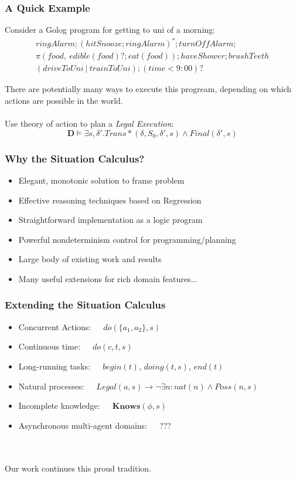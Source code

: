 \documentclass{beamer}
\newcommand{\Knows}{\mathbf{Knows}}
\begin{document}
\begin{frame}
\frametitle{A Quick Example}
Consider a Golog program for getting to uni of a morning:\[
\begin{array}{c}
ringAlarm;(hitSnooze; ringAlarm)^*;turnOffAlarm;\\
\pi(food,\ edible(food)?;eat(food)); haveShower; brushTeeth\\
(driveToUni\ |\ trainToUni); (time<9:00)?
\end{array}\]

There are potentially many ways to execute this progream, depending on which 
actions are possible in the world.
\pause
\ \\
\ \\
Use theory of action to plan a \emph{Legal Execution}:\[
\mathbf{D} \models \exists s,\delta' . Trans*(\delta,S_0,\delta',s) \wedge Final(\delta',s)\]

\end{frame}

\begin{frame}
\frametitle{Why the Situation Calculus?}
\begin{itemize}
\item Elegant, monotonic solution to frame problem
\item Effective reasoning techniques based on Regression
\item Straightforward implementation as a logic program
\item Powerful nondeterminism control for programming/planning
\item Large body of existing work and results
\item Many useful extensions for rich domain features...
\end{itemize}
\end{frame}

\begin{frame}
\frametitle{Extending the Situation Calculus}
\begin{itemize}
\pause
\item Concurrent Actions:\ \ \ $do(\{a_1,a_2\},s)$
\pause
\item Continuous time:\ \ \ $do(c,t,s)$
\pause
\item Long-running tasks:\ \ \ $begin(t)$, $doing(t,s)$, $end(t)$
\pause
\item Natural processes:\ \ \ $Legal(a,s)\rightarrow\neg\exists n: nat(n) \wedge Poss(n,s)$
\pause
\item Incomplete knowledge:\ \ \ $\Knows(\phi,s)$
\pause
\item Asynchronous multi-agent domains:\ \ \ ???
\end{itemize}
\ \\
\ \\
\pause
Our work continues this proud tradition.
\end{frame}
\end{document}
